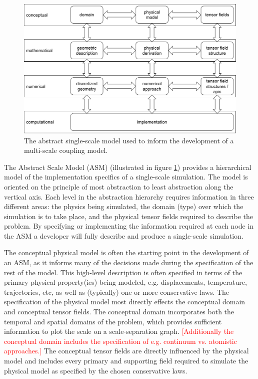 \documentclass[review]{siamart1116}
\newcommand{\red}[1]{\textcolor{red}{[#1]}}
\begin{document}
\begin{figure}
  \centering
  \includegraphics[width=.9\columnwidth]{scale-model-lines}
  \caption{The abstract single-scale model used to inform the development of a multi-scale coupling model.}
  \label{fig:scale-model}
\end{figure}

The Abstract Scale Model (ASM) (illustrated in figure \ref{fig:scale-model}) provides a hierarchical model of the implementation specifics of a single-scale simulation. The model is oriented on the principle of most abstraction to least abstraction along the vertical axis. Each level in the abstraction hierarchy requires information in three different areas: the physics being simulated, the domain (type) over which the simulation is to take place, and the physical tensor fields required to describe the problem.  By specifying or implementing the information required at each node in the ASM a developer will fully describe and produce a single-scale simulation. 

The conceptual physical model is often the starting point in the development of an ASM, as it informs many of the decisions made during the specification of the rest of the model. This high-level description is often specified in terms of the primary physical property(ies) being modeled, e.g. displacements, temperature, trajectories, etc, as well as (typically) one or more conservative laws. The specification of the physical model most directly effects the conceptual domain and conceptual tensor fields. The conceptual domain incorporates both the temporal and spatial domains of the problem, which provides sufficient information to plot the scale on a scale-separation graph. \red{Additionally the conceptual domain includes the specification of e.g. continuum vs. atomistic approaches.} The conceptual tensor fields are directly influenced by the physical model and includes every primary and supporting field required to simulate the physical model as specified by the chosen conservative laws.
\end{document}
